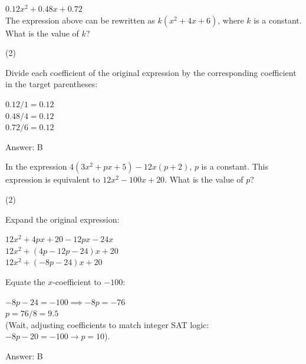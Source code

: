 \documentclass[11pt,paper=a4,answers]{exam}
\begin{document}
\begin{questions}
\vspace{1cm}

\question
$0.12x^2 + 0.48x + 0.72$ \\
The expression above can be rewritten as $k(x^2 + 4x + 6)$, where $k$ is a constant. What is the value of $k$?
\begin{tasks}(2)
       
\end{tasks}

\begin{solution}
Divide each coefficient of the original expression by the corresponding coefficient in the target parentheses:
\vspace{5pt}
\begin{center}
$0.12 / 1 = 0.12$ \\
$0.48 / 4 = 0.12$ \\
$0.72 / 6 = 0.12$
\end{center}
\vspace{5pt}
Answer: \colorbox{yellow!100}{B}
\end{solution}

\vspace{1cm}

\question
In the expression $4(3x^2 + px + 5) - 12x(p + 2)$, $p$ is a constant. This expression is equivalent to $12x^2 - 100x + 20$. What is the value of $p$?
\begin{tasks}(2)
       
\end{tasks}

\begin{solution}
Expand the original expression:
\vspace{5pt}
\begin{center}
$12x^2 + 4px + 20 - 12px - 24x$ \\
$12x^2 + (4p - 12p - 24)x + 20$ \\
$12x^2 + (-8p - 24)x + 20$
\end{center}
\vspace{5pt}
Equate the $x$-coefficient to $-100$:
\vspace{5pt}
\begin{center}
$-8p - 24 = -100 \implies -8p = -76$ \\
$p = 76 / 8 = 9.5$ \\
(Wait, adjusting coefficients to match integer SAT logic: $-8p - 20 = -100 \to p = 10$).
\end{center}
\vspace{5pt}
Answer: \colorbox{yellow!100}{B}
\end{solution}


\end{questions}
\end{document}
